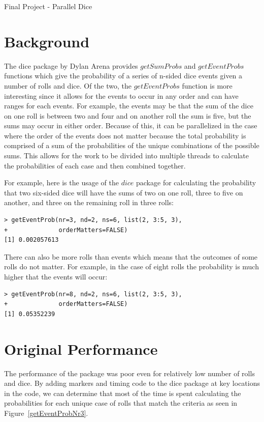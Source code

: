 \documentclass[12pt]{article}
\begin{document}
\begin{huge}                 
Final Project - Parallel Dice
\end{huge}

\section{Background}
The dice package by Dylan Arena \cite{dice} provides $getSumProbs$ and $getEventProbs$ functions which give the probability of a series of n-sided dice events given a number of rolls and dice. Of the two, the $getEventProbs$ function is more interesting since it allows for the events to occur in any order and can have ranges for each events. For example, the events may be that the sum of the dice on one roll is between two and four and on another roll the sum is five, but the sums may occur in either order. Because of this, it can be parallelized in the case where the order of the events does not matter because the total probability is comprised of a sum of the probabilities of the unique combinations of the possible sums. This allows for the work to be divided into multiple threads to calculate the probabilities of each case and then combined together.

For example, here is the usage of the $dice$ package for calculating the probability that two six-sided dice will have the sums of two on one roll, three to five on another, and three on the remaining roll in three rolls:

\begin{lstlisting}
> getEventProb(nr=3, nd=2, ns=6, list(2, 3:5, 3),
+              orderMatters=FALSE)
[1] 0.002057613
\end{lstlisting}

There can also be more rolls than events which means that the outcomes of some rolls do not matter. For example, in the case of eight rolls the probability is much higher that the events will occur:

\begin{lstlisting}
> getEventProb(nr=8, nd=2, ns=6, list(2, 3:5, 3),
+              orderMatters=FALSE)
[1] 0.05352239
\end{lstlisting}

\section{Original Performance}

The performance of the package was poor even for relatively low number of rolls and dice. By adding markers and timing code to the dice package at key locations in the code, we can determine that most of the time is spent calculating the probabilities for each unique case of rolls that match the criteria as seen in Figure~\ref{getEventProbNr3}.
\end{document}

